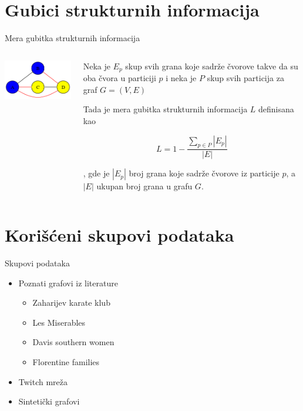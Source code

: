 \documentclass{beamer}
\begin{document}
\section{Gubici strukturnih informacija}
\begin{frame}{Mera gubitka strukturnih informacija}
    \begin{columns}
		\begin{column}{0.5\textwidth}
            \includegraphics[width=\textwidth]{dot/graf.png}
		\end{column}
		\begin{column}{0.5\textwidth}
            Neka je $ E_p $ skup svih grana koje sadrže čvorove takve da su oba čvora u particiji $ p $  i neka je $ P $ skup svih particija za graf $ G = (V, E) $
            
            Tada je mera gubitka strukturnih informacija $ L $ definisana kao
            
            $$ L = 1-\frac{\sum_{p \in P} |E_p|}{|E|} $$
            
            , gde je $ |E_p| $ broj grana koje sadrže čvorove iz particije $ p $, a $ |E| $ ukupan broj grana u grafu $ G $.
		\end{column}
	\end{columns}
\end{frame}


\section{Korišćeni skupovi podataka}
\begin{frame}{Skupovi podataka}
    \begin{itemize}
        \item Poznati grafovi iz literature 
        \begin{itemize}
            \item Zaharijev karate klub
            \item Les Miserables
            \item Davis southern women
            \item Florentine families
        \end{itemize}
        \item Twitch mreža
        \item Sintetički grafovi 
    \end{itemize}
\end{frame}
\end{document}
